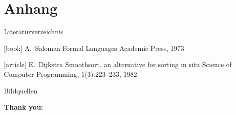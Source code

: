 \section{Anhang}
\begin{frame}{Literaturverzeichnis}
    \begin{thebibliography}{Längste Bezeichnung}
        [book]
            A.~Salomaa
            \newblock Formal Languages
            \newblock Academic Press, 1973

        [article]
            E.~Dijkstra
            \newblock Smoothsort, an alternative for sorting in situ
            \newblock Science of Computer Programming, 1(3):223--233, 1982
    \end{thebibliography}
\end{frame}

{
    \tiny
    \begin{frame}{Bildquellen}

        \textbf{Thank you:} \\
    \end{frame}
}
